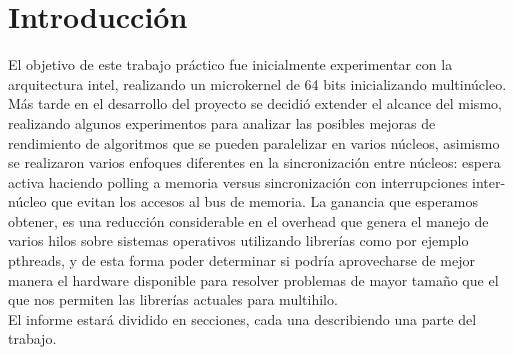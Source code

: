 \section{Introducción}
    El objetivo de este trabajo práctico fue inicialmente experimentar con la arquitectura intel, realizando un microkernel de 64 bits inicializando multinúcleo. Más tarde en el desarrollo del proyecto se decidió extender el alcance del mismo, realizando algunos experimentos para analizar las posibles mejoras de rendimiento de algoritmos que se pueden paralelizar en varios núcleos, asimismo se realizaron varios enfoques diferentes en la sincronización entre núcleos: espera activa haciendo polling a memoria versus sincronización con interrupciones inter-núcleo que evitan los accesos al bus de memoria. La ganancia que esperamos obtener, es una reducción considerable en el overhead que genera el manejo de varios hilos sobre sistemas operativos utilizando librerías como por ejemplo pthreads, y de esta forma poder determinar si podría aprovecharse de mejor manera el hardware disponible para resolver problemas de mayor tamaño que el que nos permiten las librerías actuales para multihilo.
    \\

    El informe estará dividido en secciones, cada una describiendo una parte del trabajo.
